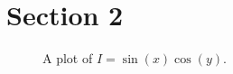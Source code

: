 \documentclass[example-with-subfiles.tex]{subfiles}
\begin{document}
    \section{Section 2}
    \begin{figure}[h]
		\caption{A plot of $I = \sin(x)\cos(y)$.}
		\label{fig:cubic}
	\end{figure}
\end{document}
